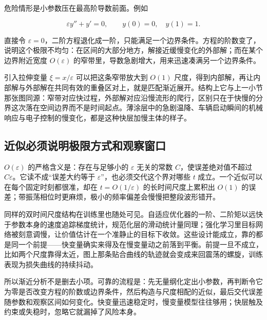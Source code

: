 危险情形是小参数压在最高阶导数前面。例如

\[
\varepsilon y''+y'=0,
\qquad
y(0)=0,\quad y(1)=1.
\]

直接令 \(\varepsilon=0\)，二阶方程退化成一阶，只能满足一个边界条件。方程的阶数变了，说明这个极限不均匀：在区间的大部分地方，解接近缓慢变化的外部解；而在某个边界附近宽度 \(O(\varepsilon)\) 的窄带里，导数急剧增大，用来迅速凑满另一个边界条件。

引入拉伸变量 \(\xi=x/\varepsilon\) 可以把这条窄带放大到 \(O(1)\) 尺度，得到内部解，再让内部解与外部解在共同有效的重叠区对上，就是匹配渐近展开。结构上它与上一小节那张图同源：窄带对应快过程，外部解对应沿慢流形的爬行，区别只在于快慢的分界这次落在空间边界而不是时间起点。薄涂层中的急剧温降、车辆启动瞬间的机械响应与电子控制的慢变化，都是这种快层加慢主体的样子。

\subsection{近似必须说明极限方式和观察窗口}

\(O(\varepsilon)\) 的严格含义是：存在与足够小的 \(\varepsilon\) 无关的常数 \(C\)，使误差绝对值不超过 \(C\varepsilon\)。它读不成``误差大约等于 \(\varepsilon\)''，也必须交代这个界对哪些 \(t\) 成立。一个近似可以在每个固定时刻都很准，却在 \(t=O(1/\varepsilon)\) 的长时间尺度上累积出 \(O(1)\) 的误差；带振荡相位时更麻烦，极小的频率偏差会慢慢把整段波形错开。

同样的双时间尺度结构在训练里也随处可见。自适应优化器的一阶、二阶矩以远快于参数本身的速度追踪梯度统计，规范化层的滑动统计量同理；强化学习里目标网络被刻意调慢，让价值估计在一个准静止的目标下收敛。这些设计能成立，靠的都是同一个前提——快变量确实来得及在慢变量动之前落到平衡。前提一旦不成立，比如两个尺度靠得太近，图上那条贴合曲线的轨迹就会变成来回震荡的螺旋，训练表现为损失曲线的持续抖动。

所以渐近分析不是删去小项。可靠的流程是：先无量纲化定出小参数，再判断令它为零是否改变方程的阶数或边界条件，然后构造与尺度相配的近似，最后交代误差随参数和观察区间如何变化。快变量迅速稳定时，慢变量模型往往够用；快层触及约束或失稳时，忽略它就漏掉了风险本身。
